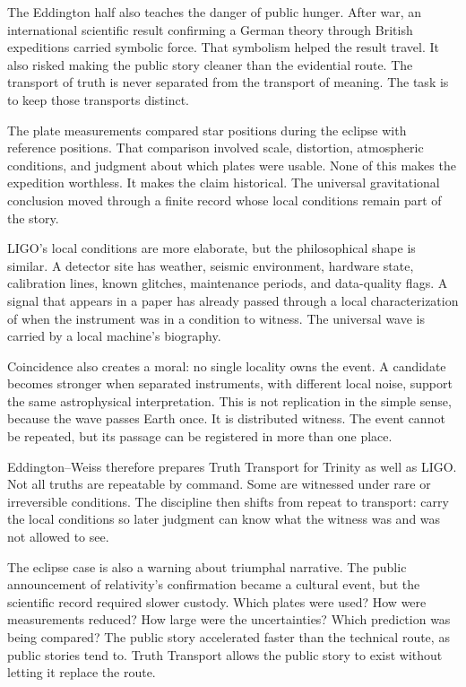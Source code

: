 The Eddington half also teaches the danger of public hunger. After war,
an international scientific result confirming a German theory through
British expeditions carried symbolic force. That symbolism helped the
result travel. It also risked making the public story cleaner than the
evidential route. The transport of truth is never separated from the
transport of meaning. The task is to keep those transports distinct.

The plate measurements compared star positions during the eclipse with
reference positions. That comparison involved scale, distortion,
atmospheric conditions, and judgment about which plates were usable. None
of this makes the expedition worthless. It makes the claim historical.
The universal gravitational conclusion moved through a finite record
whose local conditions remain part of the story.

LIGO's local conditions are more elaborate, but the philosophical shape
is similar. A detector site has weather, seismic environment, hardware
state, calibration lines, known glitches, maintenance periods, and
data-quality flags. A signal that appears in a paper has already passed
through a local characterization of when the instrument was in a
condition to witness. The universal wave is carried by a local machine's
biography.

Coincidence also creates a moral: no single locality owns the event. A
candidate becomes stronger when separated instruments, with different
local noise, support the same astrophysical interpretation. This is not
replication in the simple sense, because the wave passes Earth once. It
is distributed witness. The event cannot be repeated, but its passage can
be registered in more than one place.

Eddington--Weiss therefore prepares Truth Transport for Trinity as well
as LIGO. Not all truths are repeatable by command. Some are witnessed
under rare or irreversible conditions. The discipline then shifts from
repeat to transport: carry the local conditions so later judgment can
know what the witness was and was not allowed to see.

The eclipse case is also a warning about triumphal narrative. The public
announcement of relativity's confirmation became a cultural event, but
the scientific record required slower custody. Which plates were used?
How were measurements reduced? How large were the uncertainties? Which
prediction was being compared? The public story accelerated faster than
the technical route, as public stories tend to. Truth Transport allows
the public story to exist without letting it replace the route.

